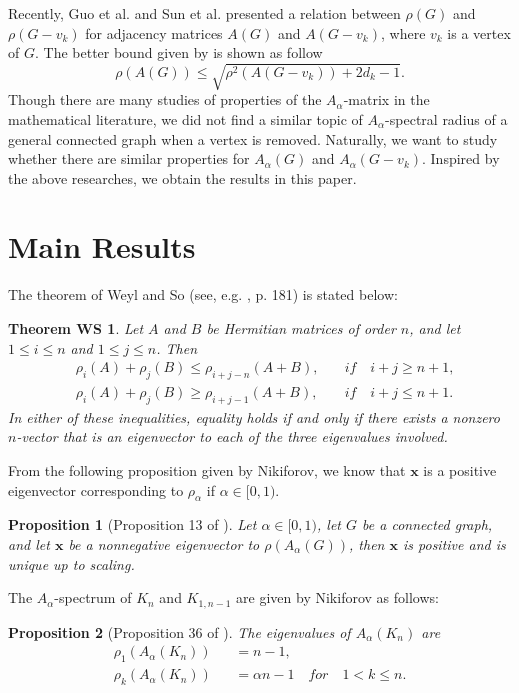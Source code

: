 \documentclass[amsthm]{elsart}
\newtheorem{proposition}{Proposition}[section]
\newtheorem*{thmWS}{Theorem WS}
\begin{document}
\qquad Recently, Guo et al. \cite{2019Sharp} and Sun et al. \cite{2019A} presented a relation between $\rho(G)$ and $\rho(G- v_k)$ for adjacency matrices $A(G)$ and $A(G- v_k)$, where $v_k$ is a vertex of $G$. The better bound given by \cite{2019A} is shown as follow $$ \rho(A(G)) \leqslant \sqrt{\rho^2(A(G - v_k)) + 2 d_k - 1}. $$
Though there are many studies of properties of
the $A_\alpha$-matrix in the mathematical literature, we did not find a similar topic of $A_\alpha$-spectral radius of a general connected graph when a vertex is removed.  Naturally, we want to study whether there are similar properties for $A_\alpha(G)$ and $A_\alpha(G-v_k)$. Inspired by the above researches, we obtain the results in this paper.



\section{Main Results}

The theorem of Weyl and So (see, e.g. \cite{1985MatrixAnalysis}, p. 181) is stated below:
\begin{thmWS} \cite{1985MatrixAnalysis} Let $A$ and $B$ be Hermitian matrices of order $n$, and let $1 \leqslant i \leqslant n$ and $1 \leqslant j \leqslant n$.
Then
\begin{eqnarray*}
&\rho _i (A) + \rho _j (B) \leqslant \rho _{i+j-n} (A + B), \quad &if \quad i+j \geqslant n + 1,
\\ &\rho _i (A) + \rho _j (B) \geqslant \rho _{i+j-1} (A + B), \quad &if \quad i+j \leqslant n + 1.
\end{eqnarray*}
In either of these inequalities, equality holds if and only if there exists a nonzero $n$-vector that is an eigenvector to each of the three eigenvalues involved.
\end{thmWS}

From the following proposition given by Nikiforov, we know that $\textbf{x}$ is a positive eigenvector corresponding to $\rho _\alpha$ if $\alpha \in [0, 1)$.
\begin{proposition}[Proposition 13 of \cite{2016Merging}] \label{prop:perron}
Let $\alpha \in [0, 1)$, let $G$ be a connected graph, and let $\textbf{x}$ be a nonnegative eigenvector to $\rho( A_\alpha(G))$, then $\textbf{x}$ is positive and is unique up to scaling.
\end{proposition}

The $A_\alpha$-spectrum of $K_n$ and $K_{1,n-1}$ are given by Nikiforov as follows:
\begin{proposition}[Proposition 36 of \cite{2016Merging}] \label{prop:3}
The eigenvalues of $A_\alpha(K_n)$  are
\begin{eqnarray*}
\rho_1 (A_\alpha(K_n)) &&= n - 1 ,
\\ \rho _k (A_\alpha(K_n)) &&= \alpha n - 1 \quad for \quad 1 < k \leqslant n .
\end{eqnarray*}
\end{proposition}
\end{document}
